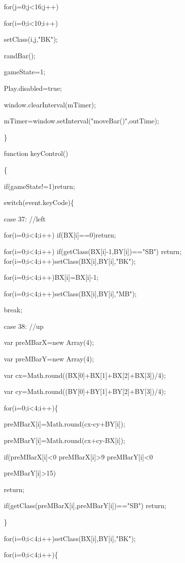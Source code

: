 \documentclass[
]{article}
\begin{document}
for(j=0;j\textless16;j++)

for(i=0;i\textless10;i++)

setClass(i,j,"BK");

randBar();

gameState=1;

Play.disabled=true;

window.clearInterval(mTimer);

mTimer=window.setInterval("moveBar()",outTime);

\}

function keyControl()

\{

if(gameState!=1)return;

switch(event.keyCode)\{

case 37: //left

for(i=0;i\textless4;i++) if(BX{[}i{]}==0)return;

for(i=0;i\textless4;i++) if(getClass(BX{[}i{]}-1,BY{[}i{]})=="SB")
return; for(i=0;i\textless4;i++)setClass(BX{[}i{]},BY{[}i{]},"BK");

for(i=0;i\textless4;i++)BX{[}i{]}=BX{[}i{]}-1;

for(i=0;i\textless4;i++)setClass(BX{[}i{]},BY{[}i{]},"MB");

break;

case 38: //up

var preMBarX=new Array(4);

var preMBarY=new Array(4);

var cx=Math.round((BX{[}0{]}+BX{[}1{]}+BX{[}2{]}+BX{[}3{]})/4);

var cy=Math.round((BY{[}0{]}+BY{[}1{]}+BY{[}2{]}+BY{[}3{]})/4);

for(i=0;i\textless4;i++)\{

preMBarX{[}i{]}=Math.round(cx-cy+BY{[}i{]});

preMBarY{[}i{]}=Math.round(cx+cy-BX{[}i{]});

if(preMBarX{[}i{]}\textless0 \textbar\textbar{}
preMBarX{[}i{]}\textgreater9 \textbar\textbar{}
preMBarY{[}i{]}\textless0 \textbar\textbar{}

preMBarY{[}i{]}\textgreater15)

return;

if(getClass(preMBarX{[}i{]},preMBarY{[}i{]})=="SB") return;

\}

for(i=0;i\textless4;i++)setClass(BX{[}i{]},BY{[}i{]},"BK");

for(i=0;i\textless4;i++)\{
\end{document}

